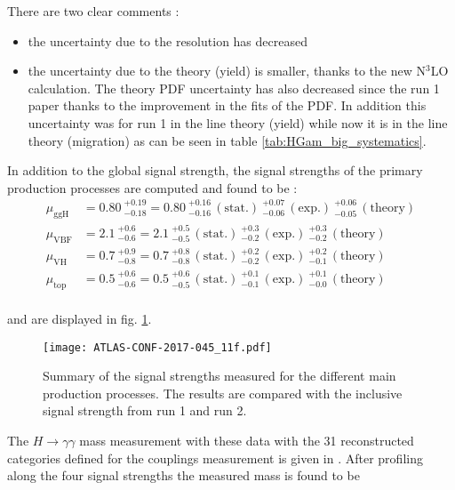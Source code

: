 There are two clear comments :
\begin{itemize}
\item the uncertainty due to the resolution has decreased
\item the uncertainty due to the theory (yield) is smaller, thanks to the new N$^3$LO calculation.
  The theory PDF uncertainty has also decreased since the run 1 paper thanks to the improvement in the fits of the PDF.
  In addition this uncertainty was for run 1 in the line theory (yield) while now it is in the line theory (migration) as can be seen in table \ref{tab:HGam_big_systematics}.
  \end{itemize}

In addition to the global signal strength, the signal strengths of the primary production processes are computed  and found to be :
  \begin{align*}
  \mu_\mathrm{ggH} &= 0.80\ ^{+0.19}_{-0.18} = 0.80\ ^{+0.16}_{-0.16}\,\mathrm{(stat.)}\ ^{+0.07}_{-0.06}\,\mathrm{(exp.)}\ ^{+0.06}_{-0.05}\,\mathrm{(theory)}\\
  \mu_\mathrm{VBF} &= 2.1\ ^{+0.6}_{-0.6} = 2.1\ ^{+0.5}_{-0.5}\,\mathrm{(stat.)}\ ^{+0.3}_{-0.2}\,\mathrm{(exp.)}\ ^{+0.3}_{-0.2}\,\mathrm{(theory)}\\
  \mu_\mathrm{VH}  &= 0.7\ ^{+0.9}_{-0.8} = 0.7\ ^{+0.8}_{-0.8}\,\mathrm{(stat.)}\ ^{+0.2}_{-0.2}\,\mathrm{(exp.)}\ ^{+0.2}_{-0.1}\,\mathrm{(theory)}\\
  \mu_\mathrm{top} &= 0.5\ ^{+0.6}_{-0.6} = 0.5\ ^{+0.6}_{-0.5}\,\mathrm{(stat.)}\ ^{+0.1}_{-0.1}\,\mathrm{(exp.)}\ ^{+0.1}_{-0.0}\,\mathrm{(theory)}\\
\end{align*}

and are displayed in fig. \ref{fig:HGam_results_muProd}.

\begin{figure}[htbp]
\centering
\texttt{[image: ATLAS-CONF-2017-045\_11f.pdf]}
\caption{\label{fig:HGam_results_muProd}
  Summary of the signal strengths measured for the different main production processes.
  The results are compared with the inclusive signal strength from run 1 and run 2.
  \cite{ATLAS-CONF-2017-045}}
\end{figure}



The $H\rightarrow\gamma\gamma$ mass measurement with these data with the 31 reconstructed categories defined for the couplings measurement is given in \cite{ATLAS-CONF-2017-046}.
After profiling along the four signal strengths the measured mass is found to be


